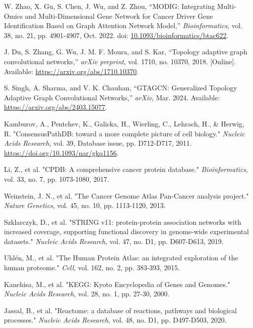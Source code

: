 \documentclass[conference]{IEEEtran}
\begin{document}
\begin{thebibliography}{99}
W. Zhao, X. Gu, S. Chen, J. Wu, and Z. Zhou, ``MODIG: Integrating Multi-Omics and Multi-Dimensional Gene Network for Cancer Driver Gene Identification Based on Graph Attention Network Model,'' \textit{Bioinformatics}, vol. 38, no. 21, pp. 4901-4907, Oct. 2022. doi: \url{10.1093/bioinformatics/btac622}.


J. Du, S. Zhang, G. Wu, J. M. F. Moura, and S. Kar, ``Topology adaptive graph convolutional networks,'' \textit{arXiv preprint}, vol. 1710, no. 10370, 2018. [Online]. Available: \url{https://arxiv.org/abs/1710.10370}.

S. Singh, A. Sharma, and V. K. Chauhan, ``GTAGCN: Generalized Topology Adaptive Graph Convolutional Networks,'' \textit{arXiv}, Mar. 2024. Available: \url{https://arxiv.org/abs/2403.15077}.






Kamburov, A., Pentchev, K., Galicka, H., Wierling, C., Lehrach, H., \& Herwig, R. "ConsensusPathDB: toward a more complete picture of cell biology." \textit{Nucleic Acids Research}, vol. 39, Database issue, pp. D712-D717, 2011. \url{https://doi.org/10.1093/nar/gkq1156}.

Li, Z., et al. "CPDB: A comprehensive cancer protein database." \textit{Bioinformatics}, vol. 33, no. 7, pp. 1073-1080, 2017.

Weinstein, J. N., et al. "The Cancer Genome Atlas Pan-Cancer analysis project." \textit{Nature Genetics}, vol. 45, no. 10, pp. 1113-1120, 2013.

Szklarczyk, D., et al. "STRING v11: protein-protein association networks with increased coverage, supporting functional discovery in genome-wide experimental datasets." \textit{Nucleic Acids Research}, vol. 47, no. D1, pp. D607-D613, 2019.

Uhlén, M., et al. "The Human Protein Atlas: an integrated exploration of the human proteome." \textit{Cell}, vol. 162, no. 2, pp. 383-393, 2015.

Kanehisa, M., et al. "KEGG: Kyoto Encyclopedia of Genes and Genomes." \textit{Nucleic Acids Research}, vol. 28, no. 1, pp. 27-30, 2000.

Jassal, B., et al. "Reactome: a database of reactions, pathways and biological processes." \textit{Nucleic Acids Research}, vol. 48, no. D1, pp. D497-D503, 2020.



\end{thebibliography}
\end{document}

